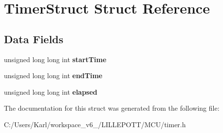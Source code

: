 \hypertarget{struct_timer_struct}{}\section{Timer\+Struct Struct Reference}
\label{struct_timer_struct}
\subsection*{Data Fields}
\begin{DoxyCompactItemize}
\item 
\mbox{\label{struct_timer_struct_a30f756807d48ebf4e3821e88a072f327}} 
unsigned long long int {\bfseries start\+Time}
\item 
\mbox{\label{struct_timer_struct_a583e600345545436751b8cc665bef6aa}} 
unsigned long long int {\bfseries end\+Time}
\item 
\mbox{\label{struct_timer_struct_a6b18ee2f4d766334e881f585523ce7e9}} 
unsigned long long int {\bfseries elapsed}
\end{DoxyCompactItemize}


The documentation for this struct was generated from the following file\+:\begin{DoxyCompactItemize}
\item 
C\+:/\+Users/\+Karl/workspace\+\_\+v6\+\_/\+L\+I\+L\+L\+E\+P\+O\+T\+T/\+M\+C\+U/timer.\+h\end{DoxyCompactItemize}
